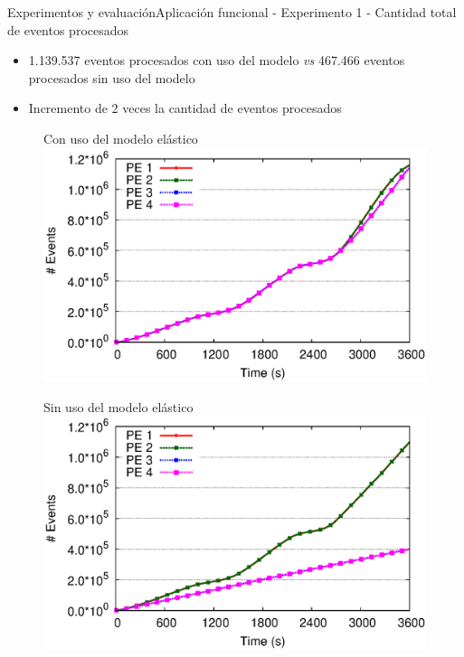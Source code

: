 \begin{frame}{Experimentos y evaluación}{Aplicación funcional - Experimento 1 - Cantidad total de eventos procesados}

\begin{itemize}
\item 1.139.537 eventos procesados con uso del modelo \textit{vs} 467.466 eventos procesados sin uso del modelo
\item Incremento de 2 veces la cantidad de eventos procesados
\end{itemize}

\begin{multicols}{2}
\begin{figure}[p]
	\centering
	{\scriptsize Con uso del modelo elástico\\}
	\includegraphics[scale=0.4]{images/exp/app1/dynamic/adaptative/exp1-eventCount.eps}
\end{figure}

\begin{figure}[p]
	\centering
	{\scriptsize Sin uso del modelo elástico\\}
	\includegraphics[scale=0.4]{images/exp/app1/dynamic/baseline/exp1-eventCount.eps}
\end{figure}
\end{multicols}
\end{frame}

